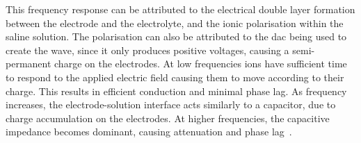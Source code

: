 This frequency response can be attributed to the electrical double layer formation between the electrode and the electrolyte, and the ionic polarisation within the saline solution.
The polarisation can also be attributed to the \gls{dac} being used to create the wave, since it only produces positive voltages, causing a semi-permanent charge on the electrodes.
At low frequencies ions have sufficient time to respond to the applied electric field causing them to move according to their charge.
This results in efficient conduction and minimal phase lag.
As frequency increases, the electrode-solution interface acts similarly to a capacitor, due to charge accumulation on the electrodes.
At higher frequencies, the capacitive impedance becomes dominant, causing attenuation and phase lag~\cite{wu_understanding_2022}.
